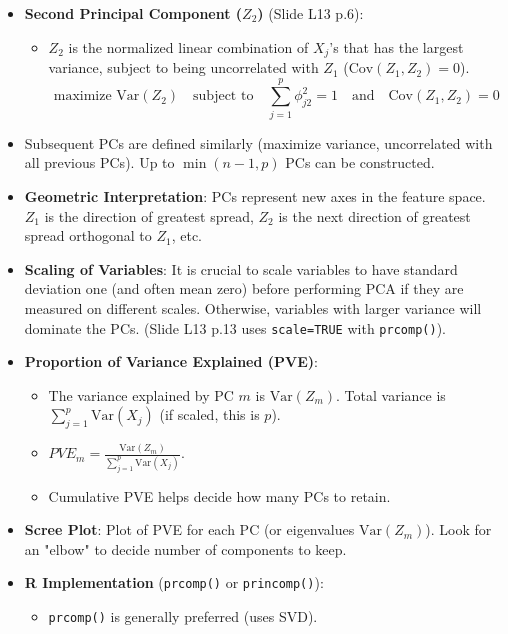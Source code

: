 \documentclass[12pt,a4paper]{article}
\newcommand{\Rfunction}[1]{\texttt{#1()}} %
\newcommand{\Rcode}[1]{\texttt{#1}} %
\begin{document}
\begin{itemize}
            \item \textbf{Second Principal Component ($Z_2$)} (Slide L13 p.6):
                \begin{itemize}
                    \item $Z_2$ is the normalized linear combination of $X_j$'s that has the largest variance, subject to being uncorrelated with $Z_1$ ($\text{Cov}(Z_1, Z_2)=0$).
                        $$ \text{maximize } \text{Var}(Z_2) \quad \text{subject to} \quad \sum_{j=1}^p \phi_{j2}^2 = 1 \quad \text{and} \quad \text{Cov}(Z_1, Z_2)=0 $$
                \end{itemize}
            \item Subsequent PCs are defined similarly (maximize variance, uncorrelated with all previous PCs). Up to $\min(n-1, p)$ PCs can be constructed.
            \item \textbf{Geometric Interpretation}: PCs represent new axes in the feature space. $Z_1$ is the direction of greatest spread, $Z_2$ is the next direction of greatest spread orthogonal to $Z_1$, etc.
            \item \textbf{Scaling of Variables}: It is crucial to scale variables to have standard deviation one (and often mean zero) before performing PCA if they are measured on different scales. Otherwise, variables with larger variance will dominate the PCs. (Slide L13 p.13 uses \Rcode{scale=TRUE} with \Rfunction{prcomp}).
            \item \textbf{Proportion of Variance Explained (PVE)}:
                \begin{itemize}
                    \item The variance explained by PC $m$ is $\text{Var}(Z_m)$. Total variance is $\sum_{j=1}^p \text{Var}(X_j)$ (if scaled, this is $p$).
                    \item $PVE_m = \frac{\text{Var}(Z_m)}{\sum_{j=1}^p \text{Var}(X_j)}$.
                    \item Cumulative PVE helps decide how many PCs to retain.
                \end{itemize}
            \item \textbf{Scree Plot}: Plot of PVE for each PC (or eigenvalues $\text{Var}(Z_m)$). Look for an "elbow" to decide number of components to keep.
            \item \textbf{R Implementation} (\Rfunction{prcomp} or \Rfunction{princomp}):
                \begin{itemize}
                    \item \Rfunction{prcomp} is generally preferred (uses SVD).

\end{itemize}
\end{itemize}
\end{document}
